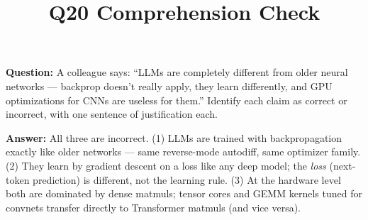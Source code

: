 \documentclass[11pt]{article}
\title{Q20 Comprehension Check}
\date{}
\begin{document}
\maketitle
\textbf{Question:} A colleague says: ``LLMs are completely different from older neural networks --- backprop doesn't really apply, they learn differently, and GPU optimizations for CNNs are useless for them.'' Identify each claim as correct or incorrect, with one sentence of justification each.

\vspace{1em}
\textbf{Answer:} All three are incorrect. (1) LLMs are trained with backpropagation exactly like older networks --- same reverse-mode autodiff, same optimizer family. (2) They learn by gradient descent on a loss like any deep model; the \emph{loss} (next-token prediction) is different, not the learning rule. (3) At the hardware level both are dominated by dense matmuls; tensor cores and GEMM kernels tuned for convnets transfer directly to Transformer matmuls (and vice versa).
\end{document}
